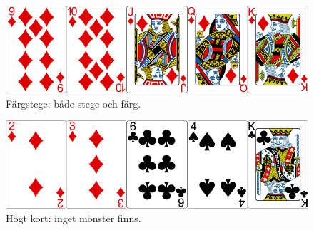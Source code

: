 \begin{figure}[H]
 \begin{minipage}[c]{\CardWidth}
  \includegraphics[width=\textwidth]{../img/w05-hands/straightflush.png}
 \end{minipage}
 \begin{minipage}[c]{\CardCaptionWidth}
  \caption{Färgstege: både stege och färg.}
 \end{minipage}
\end{figure}

\begin{figure}[H]
 \begin{minipage}[c]{\CardWidth}
  \includegraphics[width=\textwidth]{../img/w05-hands/none.png}
 \end{minipage}
 \begin{minipage}[c]{\CardCaptionWidth}
  \caption{Högt kort: inget mönster finns.}
 \label{lab:shuffle:last-picture}
  \end{minipage}
\end{figure}
